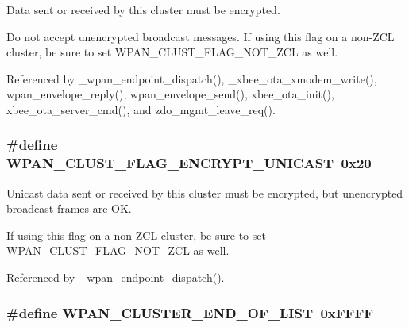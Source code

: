 Data sent or received by this cluster must be encrypted. 

Do not accept unencrypted broadcast messages. If using this flag on a non-\/\-Z\-C\-L cluster, be sure to set W\-P\-A\-N\-\_\-\-C\-L\-U\-S\-T\-\_\-\-F\-L\-A\-G\-\_\-\-N\-O\-T\-\_\-\-Z\-C\-L as well. 

Referenced by \-\_\-wpan\-\_\-endpoint\-\_\-dispatch(), \-\_\-xbee\-\_\-ota\-\_\-xmodem\-\_\-write(), wpan\-\_\-envelope\-\_\-reply(), wpan\-\_\-envelope\-\_\-send(), xbee\-\_\-ota\-\_\-init(), xbee\-\_\-ota\-\_\-server\-\_\-cmd(), and zdo\-\_\-mgmt\-\_\-leave\-\_\-req().

\hypertarget{group__wpan__aps_ga1ccfd85378afaa02de5c3f9c71c17df4}{
\subsubsection[{W\-P\-A\-N\-\_\-\-C\-L\-U\-S\-T\-\_\-\-F\-L\-A\-G\-\_\-\-E\-N\-C\-R\-Y\-P\-T\-\_\-\-U\-N\-I\-C\-A\-S\-T}]{\setlength{\rightskip}{0pt plus 5cm}\#define W\-P\-A\-N\-\_\-\-C\-L\-U\-S\-T\-\_\-\-F\-L\-A\-G\-\_\-\-E\-N\-C\-R\-Y\-P\-T\-\_\-\-U\-N\-I\-C\-A\-S\-T~0x20}}\label{group__wpan__aps_ga1ccfd85378afaa02de5c3f9c71c17df4}


Unicast data sent or received by this cluster must be encrypted, but unencrypted broadcast frames are O\-K. 

If using this flag on a non-\/\-Z\-C\-L cluster, be sure to set W\-P\-A\-N\-\_\-\-C\-L\-U\-S\-T\-\_\-\-F\-L\-A\-G\-\_\-\-N\-O\-T\-\_\-\-Z\-C\-L as well. 

Referenced by \-\_\-wpan\-\_\-endpoint\-\_\-dispatch().

\hypertarget{group__wpan__aps_gacbfdff1cef70167f178c4e05b69f65fe}{
\subsubsection[{W\-P\-A\-N\-\_\-\-C\-L\-U\-S\-T\-E\-R\-\_\-\-E\-N\-D\-\_\-\-O\-F\-\_\-\-L\-I\-S\-T}]{\setlength{\rightskip}{0pt plus 5cm}\#define W\-P\-A\-N\-\_\-\-C\-L\-U\-S\-T\-E\-R\-\_\-\-E\-N\-D\-\_\-\-O\-F\-\_\-\-L\-I\-S\-T~0x\-F\-F\-F\-F}}\label{group__wpan__aps_gacbfdff1cef70167f178c4e05b69f65fe}


